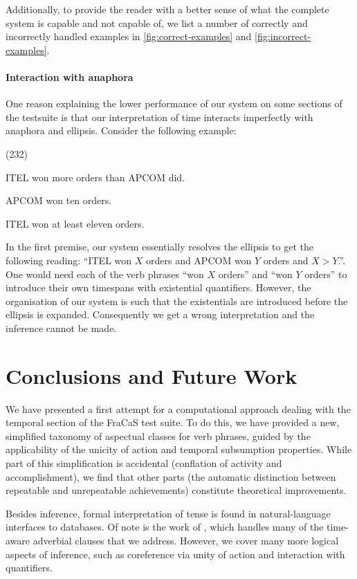 \documentclass[a4paper,twoside]{article}
\newcommand\hyp{\item[H]}
\newcommand\fracasex[2]{\begin{lingex}\item[(#1)] \begin{subex} #2 \end{subex} \end{lingex} }
\begin{document}
Additionally, to provide the reader with a better sense of what the
complete system is capable and not capable of, we list a number of
correctly and incorrectly handled examples in \cref{fig:correct-examples} and \cref{fig:incorrect-examples}.
\paragraph{Interaction with anaphora}
\label{sec:interaction-with-anaphora}
One reason explaining the lower performance of our system on some
sections of the testsuite is that our interpretation of time interacts
imperfectly with anaphora and ellipsis. Consider the following example:

\fracasex{232}
{\item	ITEL won more orders than APCOM did.
\item	APCOM won ten orders.
\hyp 	ITEL won at least eleven orders.
}

In the first premise, our system essentially resolves the ellipsis to
get the following reading: ``ITEL won \(X\) orders and APCOM won \(Y\) orders
and $X > Y$.''. One would need each of the verb phrases ``won \(X\) orders''
and ``won $Y$ orders'' to introduce their own timespans with existential
quantifiers. However, the organisation of our system is such that the
existentials are introduced before the ellipsis is
expanded. Consequently we get a wrong interpretation and the inference
cannot be made.


\section{Conclusions and Future Work}
\label{sec:conclusion}

We have presented a first attempt for a computational approach dealing
with the temporal section of the FraCaS test suite. To do this, we
have provided a new, simplified taxonomy of aspectual classes for verb
phrases, guided by the applicability of the unicity of action and
temporal subsumption properties. While part of this simplification is
accidental (conflation of activity and accomplishment), we find that
other parts (the automatic distinction between repeatable and
unrepeatable achievements) constitute theoretical improvements.

Besides inference, formal interpretation of tense is found in
natural-language interfaces to databases. Of note is the work of
\citet{androutsopoulos1998time}, which handles many of the time-aware
adverbial clauses that we address. However, we cover many more
 logical aspects of inference, such as coreference via
unity of action and interaction with quantifiers.
\end{document}

